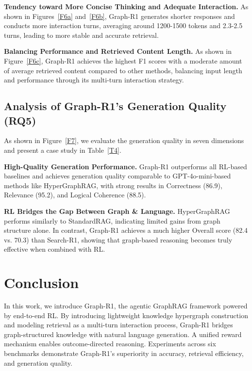 \documentclass{article}
\theoremstyle{plain}
\theoremstyle{definition}
\theoremstyle{remark}
\begin{document}
\textbf{Tendency toward More Concise Thinking and Adequate Interaction. }
As shown in Figures~\ref{F6a} and~\ref{F6b}, Graph-R1 generates shorter responses and conducts more interaction turns, averaging around 1200-1500 tokens and 2.3-2.5 turns, leading to more stable and accurate retrieval.

\textbf{Balancing Performance and Retrieved Content Length. }
As shown in Figure~\ref{F6c}, Graph-R1 achieves the highest F1 scores with a moderate amount of average retrieved content compared to other methods, balancing input length and performance through its multi-turn interaction strategy.

\subsection{Analysis of Graph-R1's Generation Quality (RQ5)}
\label{5.6}
As shown in Figure~\ref{F7}, we evaluate the generation quality in seven dimensions and present a case study in Table~\ref{T4}.

\textbf{High-Quality Generation Performance. }
Graph-R1 outperforms all RL-based baselines and achieves generation quality comparable to GPT-4o-mini-based methods like HyperGraphRAG, with strong results in Correctness (86.9), Relevance (95.2), and Logical Coherence (88.5).

\textbf{RL Bridges the Gap Between Graph \& Language. }
HyperGraphRAG performs similarly to StandardRAG, indicating limited gains from graph structure alone. In contrast, Graph-R1 achieves a much higher Overall score (82.4 vs. 70.3) than Search-R1, showing that graph-based reasoning becomes truly effective when combined with RL.




\section{Conclusion}
In this work, we introduce Graph-R1, the agentic GraphRAG framework powered by end-to-end RL. By introducing lightweight knowledge hypergraph construction and modeling retrieval as a multi-turn interaction process, Graph-R1 bridges graph-structured knowledge with natural language generation. A unified reward mechanism enables outcome-directed reasoning. Experiments across six benchmarks demonstrate Graph-R1’s superiority in accuracy, retrieval efficiency, and generation quality.

\clearpage
\end{document}
